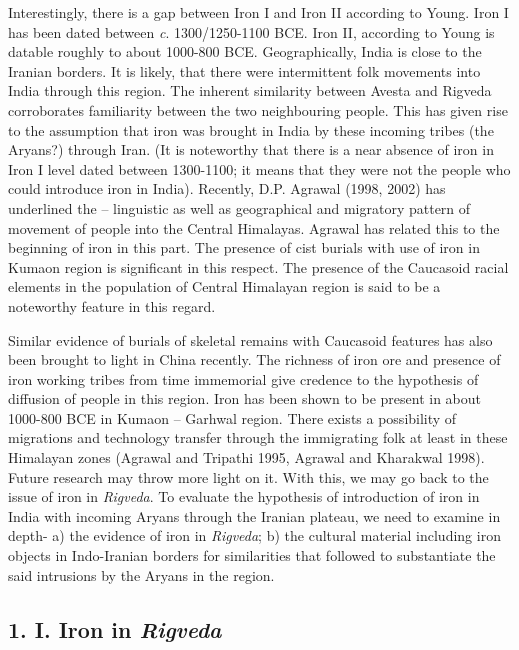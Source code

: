 Interestingly, there is a gap between Iron I and Iron II according to Young. Iron I has been dated between \textit{c}. 1300/1250-1100 BCE. Iron II, according to Young is datable roughly to about 1000-800 BCE. Geographically, India is close to the Iranian borders. It is likely, that there were intermittent folk movements into India through this region. The inherent similarity between Avesta and Rigveda corroborates familiarity  between the two neighbouring people. This has given rise to the assumption that iron was brought in India by these incoming tribes (the Aryans?) through Iran. (It is noteworthy that there is a near absence of iron in Iron I level dated between 1300-1100; it means that they were not the people who could introduce iron in India). Recently, D.P. Agrawal (1998, 2002) has underlined the – linguistic as well as geographical and migratory pattern of movement of people into the Central Himalayas. Agrawal has related this to the beginning of iron in this part. The presence of cist burials with use of iron in Kumaon region is significant in this respect. The presence of the Caucasoid racial elements in the population of Central Himalayan region is said to be a noteworthy feature in this regard. 

Similar evidence of burials of skeletal remains with Caucasoid features has also been brought to light in China recently. The richness of iron ore and presence of iron working tribes from time immemorial give credence to the hypothesis of diffusion of people in this region. Iron has been shown to be present in about 1000-800 BCE in Kumaon – Garhwal region. There exists a possibility of migrations and technology transfer through the immigrating folk at least in these Himalayan zones (Agrawal and Tripathi 1995, Agrawal and Kharakwal 1998). Future research may throw more light on it. With this, we may go back to the issue of iron in \textit{Rigveda}. To evaluate the hypothesis of introduction of iron in India with incoming Aryans through the Iranian plateau, we need to examine in depth- a) the evidence of iron in \textit{Rigveda}; b) the cultural material including iron objects in Indo-Iranian borders for similarities that followed to substantiate the said intrusions by the Aryans in the region.

\subsection*{1. I. Iron in \textit{Rigveda}}\label{subsection-1}

